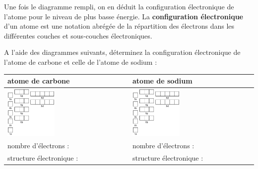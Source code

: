 \documentclass[
  11pt,
  french,
  a4paper,
  openany]{book}
\begin{document}
Une fois le diagramme rempli, on en déduit la configuration électronique de l'atome pour le niveau de plus basse énergie. La \textbf{configuration électronique} d'un atome est une notation abrégée de la répartition des électrons dans les différentes couches et sous-couches électroniques.

\begin{Exercise}
A l'aide des diagrammes suivants, déterminez la configuration électronique de l'atome de carbone et celle de l'atome de sodium :

\end{Exercise}

\begin{longtable}[]{@{}ll@{}}
\toprule
atome de carbone & atome de sodium\tabularnewline
\midrule
\endhead
\includegraphics[width=0.4\textwidth,height=\textheight]{images/energy-level-2.png} & \includegraphics[width=0.4\textwidth,height=\textheight]{images/energy-level-2.png}\tabularnewline
nombre d'électrons : & nombre d'électrons :\tabularnewline
structure électronique : & structure électronique :\tabularnewline
\bottomrule
\end{longtable}
\end{document}
